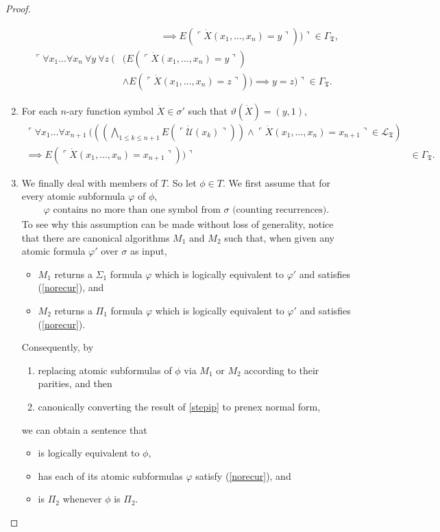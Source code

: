 \documentclass[12pt]{article}
\numberwithin{equation}{section}
\begin{document}
\begin{proof}
\begin{enumerate}[label=(\arabic*)]
\begin{align*}
        & \mspace{70mu} \implies E(\ulcorner \dot{X}(x_1, \dots, x_n) = y \urcorner)) \urcorner \in \Gamma_{\mathfrak{T}}, \\
        \ulcorner \forall x_1 \dots \forall x_n \ \forall y \ \forall z \ ( & (E(\ulcorner \dot{X} (x_1, \dots, x_n) = y \urcorner) \\ 
        & \wedge E(\ulcorner \dot{X} (x_1, \dots, x_n) = z \urcorner)) \implies y = z) \urcorner \in \Gamma_{\mathfrak{T}}.
    \end{align*}
    \item\label{gamma5} For each $n$-ary function symbol $\dot{X} \in \sigma'$ such that $\vartheta(\dot{X}) = (y, 1)$, 
    \begin{align*}
        \ulcorner \forall x_1 \dots \forall x_{n+1} \ (((\bigwedge_{1 \leq k \leq n+1} E(\ulcorner \dot{\mathcal{U}}(x_k) \urcorner)) \wedge \ulcorner \dot{X}(x_1, \dots, x_n) = x_{n+1} \urcorner \in \mathcal{L}_{\mathfrak{T}}) & \\
        \implies E(\ulcorner \dot{X}(x_1, \dots, x_n) = x_{n+1} \urcorner)) \urcorner & \in \Gamma_{\mathfrak{T}}.
    \end{align*}
    \item\label{gamma6} We finally deal with members of $T$. So let $\phi \in T$. We first assume that for every atomic subformula $\varphi$ of $\phi$, 
    \begin{align}\label{norecur}
        \varphi \text{ contains no more than one symbol from } \sigma \text{ (counting recurrences).} 
    \end{align} 
    To see why this assumption can be made without loss of generality, notice that there are canonical algorithms $M_1$ and $M_2$ such that, when given any atomic formula $\varphi'$ over $\sigma$ as input,
    \begin{itemize}
        \item $M_1$ returns a $\Sigma_1$ formula $\varphi$ which is logically equivalent to $\varphi'$ and satisfies (\ref{norecur}), and
        \item $M_2$ returns a $\Pi_1$ formula $\varphi$ which is logically equivalent to $\varphi'$ and satisfies (\ref{norecur}).
    \end{itemize}
    Consequently, by 
    \begin{enumerate}[label=(\Roman*)]
        \item\label{stepip} replacing atomic subformulas of $\phi$ via $M_1$ or $M_2$ according to their parities, and then
        \item canonically converting the result of \ref{stepip} to prenex normal form,
    \end{enumerate}
    we can obtain a sentence that
    \begin{itemize}
        \item is logically equivalent to $\phi$,
        \item has each of its atomic subformulas $\varphi$ satisfy (\ref{norecur}), and
        \item is $\Pi_2$ whenever $\phi$ is $\Pi_2$.
    \end{itemize}
    

\end{enumerate}
\end{proof}
\end{document}
